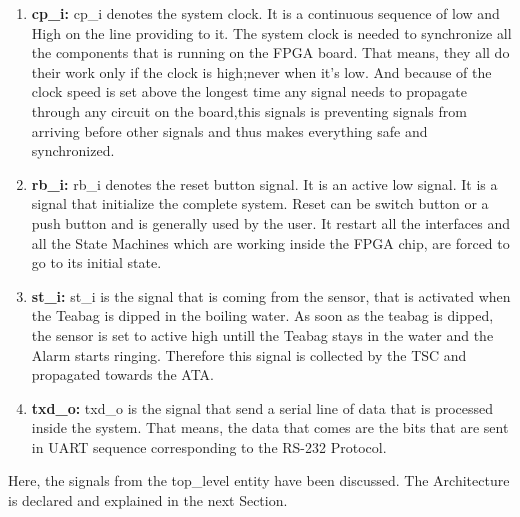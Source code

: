 \documentclass[12pt,a4paper]{article}
\begin{document}
\begin{enumerate}
\item \textbf{cp\_i:} cp\_i denotes the system clock. It is a continuous sequence of low and High on the line providing to it. The system clock is needed to synchronize all the components that is running on the FPGA board. That means, they all do their work only if the clock is high;never when it’s low. And because of the clock speed is set above the longest time any signal needs to propagate through any circuit on the board,this signals is preventing signals from arriving before other signals and thus makes everything safe and synchronized.

\item \textbf{rb\_i:} rb\_i denotes the reset button signal. It is an active low signal. It is a signal that initialize the complete system. Reset can be switch button or a push button and is generally used by the user. It restart all the interfaces and all the State Machines which are working inside the FPGA chip, are forced to go to its initial state. 

\item \textbf{st\_i:} st\_i is the signal that is coming from the sensor, that is activated when the Teabag is dipped in the boiling water. As soon as the teabag is dipped, the sensor is set to active high untill the Teabag stays in the water and the Alarm starts ringing. Therefore this signal is collected by the TSC and propagated towards the ATA.

\item \textbf{txd\_o:} txd\_o is the signal that send a serial line of data that is processed inside the system. That means, the data that comes are the bits that are sent in UART sequence corresponding to the RS-232 Protocol.

\end{enumerate}

Here, the signals from the top\_level entity have been discussed. The Architecture is declared and explained in the next Section.\
\end{document}

